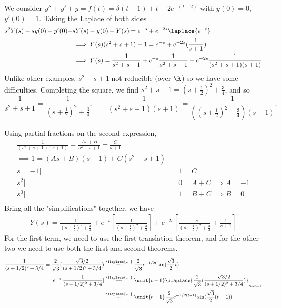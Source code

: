 \begin{example}[Cursed]
   We consider $y'' + y' + y = f(t) = \delta(t - 1) + \unit{t - 2}e^{-(t-2)}$ with $y(0) = 0$, $y'(0) = 1$. Taking the Laplace of both sides \begin{align*}
    s^2Y(s) - s y(0) - y'(0) +& sY(s) - y(0) + Y(s) = e^{-s} + e^{-2s}\laplace{e^{-t}}\\
    &\implies Y(s)(s^2 + s + 1) - 1 = e^{-s}+e^{-2s}(\frac{1}{s+1})\\
    &\implies Y(s) = \frac{1}{s^2 + s + 1} + e^{-s} \frac{1}{s^2 + s + 1} + e^{-2s} \frac{1}{(s^2+s+1)(s+1)}
   \end{align*}
   Unlike other examples, $s^2 + s + 1$ not reducible (over $\R$) so we have some difficulties. Completing the square, we find $s^2 + s + 1 = (s + \frac{1}{2})^2 + \frac{3}{4}$, and so \[\frac{1}{s^2 + s + 1} = \frac{1}{(s + \frac{1}{2})^2 + \frac{3}{4}}, \qquad \frac{1}{(s^2 + s + 1)(s + 1)} = \frac{1}{((s+\frac{1}{2})^2 + \frac{3}{4})(s + 1)}.\]

   Using partial fractions on the second expression, \begin{align*}
    \frac{1}{(s^2+s+1)(s+1)} = \frac{As + B}{s^2+s+1} + \frac{C}{s+1}&\\
    \implies 1 = (As + B)(s + 1) + C(s^2 + s + 1)&\\
    s = -1]& \quad 1 = C\\
    s^2]& \quad 0 = A + C \implies A = -1\\
    s^0]& \quad 1 = B + C \implies B = 0\\
   \end{align*}
   Bring all the "simplifications" together, we have \begin{align*}
    Y(s) = \frac{1}{(s + \frac{1}{2})^2 + \frac{3}{4}} + e^{-s}[\frac{1}{(s+\frac{1}{2})^2 + \frac{3}{4}}] + e^{-2s}[\frac{-s}{(s + \frac{1}{2})^2 + \frac{3}{4}} + \frac{1}{s+1}]
   \end{align*}
   For the first term, we need to use the first translation theorem, and for the other two we need to use both the first and second theorems.
   \begin{align*}
    \frac{1}{(s+1/2)^2 + 3/4} = \frac{2}{\sqrt{3}}(\frac{\sqrt{3}/2}{(s + 1/2)^2 + 3/4}) &\overset{\ilaplace{\dots}}{\rightsquigarrow} \frac{2}{\sqrt{3}}e^{-1/2 t} \sin(\frac{\sqrt{3}}{2}t)\\
    e^{-s}[\frac{1}{(s+1/2)^2 + 3/4}]  &\overset{\ilaplace{\dots}}{\rightsquigarrow} \unit{t - 1}\ilaplace{\frac{2}{\sqrt{3}}(\frac{\sqrt{3}/2}{(s + 1/2)^2 + 3/4})}_{t \mapsto t -1} \\
    &\overset{\ilaplace{\dots}}{\rightsquigarrow} \unit{t - 1}\frac{2}{\sqrt{3}}e^{-1/2 (t-1)} \sin(\frac{\sqrt{3}}{2}(t-1))\\
   \end{align*}
\end{example}